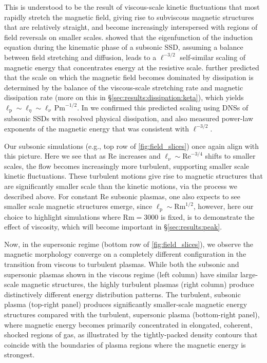 \documentclass[12pt,twoside]{extreport}
\newcommand{\mReh}{\ensuremath{\mathrm{Re}}} %
\newcommand{\mRem}{\ensuremath{\mathrm{Rm}}} %
\newcommand{\mPrm}{\ensuremath{\mathrm{Pm}}} %
\newcommand{\eg}{e.g.,\xspace} %
\begin{document}
This is understood to be the result of viscous-scale kinetic fluctuations that most rapidly stretch the magnetic field, giving rise to subviscous magnetic structures that are relatively straight, and become increasingly interspersed with regions of field reversals on smaller scales. \citet{kazantsev1968} showed that the eigenfunction of the induction equation during the kinematic phase of a subsonic SSD, assuming a balance between field stretching and diffusion, leads to a $\ell^{-3/2}$ self-similar scaling of magnetic energy that concentrates energy at the resistive scale. \citet{schekochihin2004simulations} further predicted that the scale on which the magnetic field becomes dominated by dissipation is determined by the balance of the viscous-scale stretching rate and magnetic dissipation rate (more on this in \S\ref{sec:results:dissipation:keta}), which yields $\ell_\mathrm{p} \sim \ell_\eta \sim \ell_\nu \,\mPrm^{-1/2}$. In  we confirmed this predicted scaling using DNSs of subsonic SSDs with resolved physical dissipation, and also measured power-law exponents of the magnetic energy that was consistent with $\ell^{-3/2}$.

Our subsonic simulations (\eg top row of \autoref{fig:field_slices}) once again align with this picture. Here we see that as $\mReh$ increases and $\ell_\nu \sim \mReh^{-3/4}$ shifts to smaller scales, the flow becomes increasingly more turbulent, supporting smaller scale kinetic fluctuations. These turbulent motions give rise to magnetic structures that are significantly smaller scale than the kinetic motions, via the process we described above. For constant $\mReh$ subsonic plasmas, one also expects to see smaller scale magnetic structures emerge, since $\ell_\mathrm{p} \sim \mRem^{1/2}$, however, here our choice to highlight simulations where $\mRem = 3000$ is fixed, is to demonstrate the effect of viscosity, which will become important in \S\ref{sec:results:peak}.

Now, in the supersonic regime (bottom row of \autoref{fig:field_slices}), we observe the magnetic morphology converge on a completely different configuration in the transition from viscous to turbulent plasmas. While both the subsonic and supersonic plasmas shown in the viscous regime (left column) have similar large-scale magnetic structures, the highly turbulent plasmas (right column) produce distinctively different energy distribution patterns. The turbulent, subsonic plasma (top-right panel) produces significantly smaller-scale magnetic energy structures compared with the turbulent, supersonic plasma (bottom-right panel), where magnetic energy becomes primarily concentrated in elongated, coherent, shocked regions of gas, as illustrated by the tightly-packed density contours that coincide with the boundaries of plasma regions where the magnetic energy is strongest.
\end{document}
